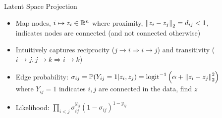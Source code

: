 \documentclass[final]{beamer}
\newlength{\sepwid}
\newlength{\onecolwid}
\newlength{\twocolwid}
\begin{document}
\begin{frame}[t]
\begin{columns}[t]
\begin{column}{\onecolwid}


\end{column} %

\begin{column}{\sepwid}\end{column} %

\begin{column}{\twocolwid} %

\begin{columns}[t,totalwidth=\twocolwid] %

\begin{column}{\onecolwid}\vspace{-.6in} %


  \begin{block}{Latent Space Projection}
    \begin{itemize}
    \item Map nodes, $i\mapsto z_i\in\mathbb{R}^n$ where proximity,
    $\left\|z_i-z_j\right\|_2=d_{ij}<1$, indicates nodes are connected (and not
    connected otherwise)
    \item Intuitively captures reciprocity ($j\rightarrow i\Rightarrow i\rightarrow j$) and
    transitivity ($i\rightarrow j, j\rightarrow k\Rightarrow
    i\rightarrow k$)
  \item Edge probability: $\sigma_{ij} = \mathbb{P}(Y_{ij}=1|z_i,z_j) = \textrm{logit}^{-1}\left(\alpha + \left\|z_i-z_j\right\|_2^2\right)$
    where $Y_{ij}=1$ indicates $i,j$ are connected in the data, find $z$
  \item Likelihood: $\prod_{i<j} \sigma_{ij}^{y_{ij}}(1- \sigma_{ij})^{1-y_{ij}}$
  \end{itemize}





\end{block}
\end{column}
\end{columns}
\end{column}
\end{columns}
\end{frame}
\end{document}
